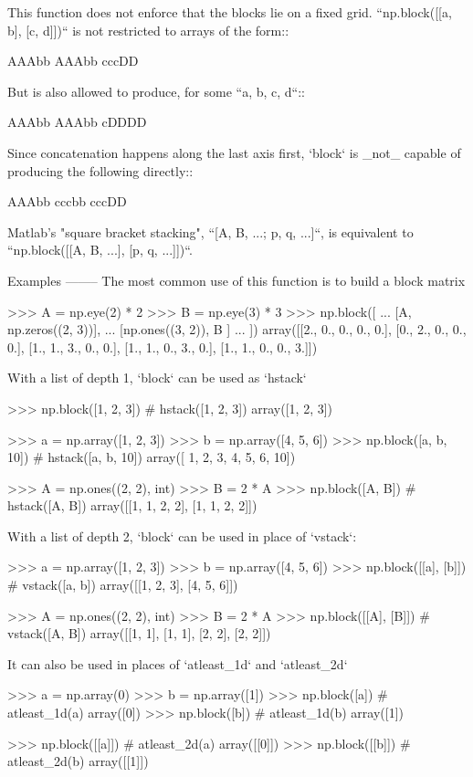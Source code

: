 \begin{DoxyVerb}
This function does not enforce that the blocks lie on a fixed grid.
``np.block([[a, b], [c, d]])`` is not restricted to arrays of the form::

    AAAbb
    AAAbb
    cccDD

But is also allowed to produce, for some ``a, b, c, d``::

    AAAbb
    AAAbb
    cDDDD

Since concatenation happens along the last axis first, `block` is _not_
capable of producing the following directly::

    AAAbb
    cccbb
    cccDD

Matlab's "square bracket stacking", ``[A, B, ...; p, q, ...]``, is
equivalent to ``np.block([[A, B, ...], [p, q, ...]])``.

Examples
--------
The most common use of this function is to build a block matrix

>>> A = np.eye(2) * 2
>>> B = np.eye(3) * 3
>>> np.block([
...     [A,               np.zeros((2, 3))],
...     [np.ones((3, 2)), B               ]
... ])
array([[2., 0., 0., 0., 0.],
       [0., 2., 0., 0., 0.],
       [1., 1., 3., 0., 0.],
       [1., 1., 0., 3., 0.],
       [1., 1., 0., 0., 3.]])

With a list of depth 1, `block` can be used as `hstack`

>>> np.block([1, 2, 3])              # hstack([1, 2, 3])
array([1, 2, 3])

>>> a = np.array([1, 2, 3])
>>> b = np.array([4, 5, 6])
>>> np.block([a, b, 10])             # hstack([a, b, 10])
array([ 1,  2,  3,  4,  5,  6, 10])

>>> A = np.ones((2, 2), int)
>>> B = 2 * A
>>> np.block([A, B])                 # hstack([A, B])
array([[1, 1, 2, 2],
       [1, 1, 2, 2]])

With a list of depth 2, `block` can be used in place of `vstack`:

>>> a = np.array([1, 2, 3])
>>> b = np.array([4, 5, 6])
>>> np.block([[a], [b]])             # vstack([a, b])
array([[1, 2, 3],
       [4, 5, 6]])

>>> A = np.ones((2, 2), int)
>>> B = 2 * A
>>> np.block([[A], [B]])             # vstack([A, B])
array([[1, 1],
       [1, 1],
       [2, 2],
       [2, 2]])

It can also be used in places of `atleast_1d` and `atleast_2d`

>>> a = np.array(0)
>>> b = np.array([1])
>>> np.block([a])                    # atleast_1d(a)
array([0])
>>> np.block([b])                    # atleast_1d(b)
array([1])

>>> np.block([[a]])                  # atleast_2d(a)
array([[0]])
>>> np.block([[b]])                  # atleast_2d(b)
array([[1]])\end{DoxyVerb}
 \mbox{\label{namespacenumpy_1_1core_1_1shape__base_aecb8183f9d76d9a46f7dc863a3ac6aad}} 
